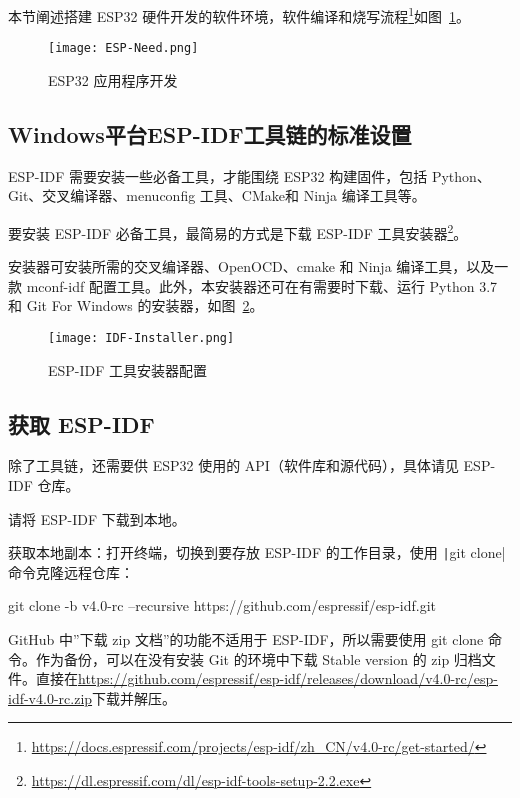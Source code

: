 本节阐述搭建 ESP32 硬件开发的软件环境，软件编译和烧写流程\footnote{\url{https://docs.espressif.com/projects/esp-idf/zh_CN/v4.0-rc/get-started/}}如图~\ref{fig:ESP-Need}。

\begin{figure}[htbp]
    \centering
    \texttt{[image: ESP-Need.png]}
    \caption{ESP32 应用程序开发}
    \label{fig:ESP-Need}
\end{figure}

\subsection{Windows平台ESP-IDF工具链的标准设置}

ESP-IDF 需要安装一些必备工具，才能围绕 ESP32 构建固件，包括 Python、Git、交叉编译器、menuconfig 工具、CMake和 Ninja 编译工具等。

要安装 ESP-IDF 必备工具，最简易的方式是下载 ESP-IDF 工具安装器\footnote{\url{https://dl.espressif.com/dl/esp-idf-tools-setup-2.2.exe}}。

安装器可安装所需的交叉编译器、OpenOCD、cmake 和 Ninja 编译工具，以及一款 mconf-idf 配置工具。此外，本安装器还可在有需要时下载、运行 Python 3.7 和 Git For Windows 的安装器，如图~\ref{fig:IDF-Installer}。

\begin{figure}[htbp]
    \centering
    \texttt{[image: IDF-Installer.png]}
    \caption{ESP-IDF 工具安装器配置}
    \label{fig:IDF-Installer}
\end{figure}

\subsection{获取 ESP-IDF}

除了工具链，还需要供 ESP32 使用的 API（软件库和源代码），具体请见 ESP-IDF 仓库。

请将 ESP-IDF 下载到本地。

获取本地副本：打开终端，切换到要存放 ESP-IDF 的工作目录，使用 \texttt|git clone| 命令克隆远程仓库：

\begin{tcolorbox}
    git clone -b v4.0-rc --recursive https://github.com/espressif/esp-idf.git
\end{tcolorbox}

GitHub 中”下载 zip 文档”的功能不适用于 ESP-IDF，所以需要使用 git clone 命令。作为备份，可以在没有安装 Git 的环境中下载 Stable version 的 zip 归档文件。直接在\url{https://github.com/espressif/esp-idf/releases/download/v4.0-rc/esp-idf-v4.0-rc.zip}下载并解压。

